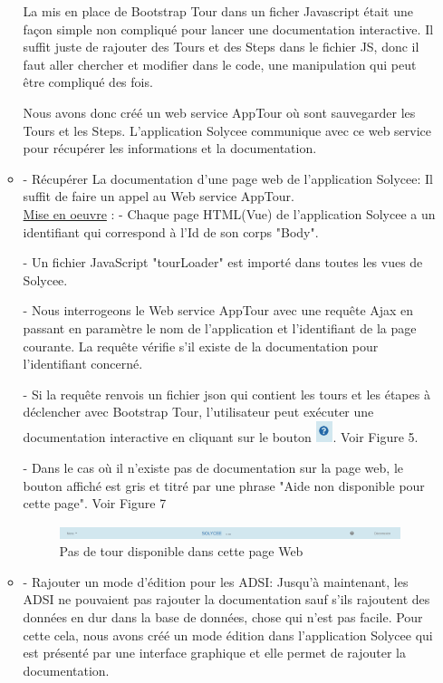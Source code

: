 \documentclass[12pt]{article}
\begin{document}
\begin{enumerate}
\begin{itemize}
La mis en place de Bootstrap Tour dans un ficher Javascript était une façon simple non compliqué pour lancer une documentation interactive. Il suffit juste de rajouter des Tours et des Steps dans le fichier JS, donc il faut aller chercher et modifier dans le code, une manipulation qui peut être compliqué des fois.

Nous avons donc créé un web service AppTour où sont sauvegarder les Tours et les Steps. L'application Solycee communique avec ce web service pour récupérer les informations et la documentation. \\ 

\item - Récupérer La documentation d'une page web de l'application Solycee: Il suffit de faire un appel au Web service AppTour. \\   
 
\underline{Mise en oeuvre} :
- Chaque page HTML(Vue) de l'application Solycee a un identifiant qui correspond à l'Id de son corps "Body".

- Un fichier JavaScript "tourLoader" est importé dans toutes les vues de Solycee.

- Nous interrogeons le Web service AppTour avec une requête Ajax en passant en paramètre le nom de l'application et l'identifiant de la page courante. La requête vérifie s'il existe de la documentation pour l’identifiant concerné. 

- Si la requête renvois un fichier json qui contient les tours et les étapes à déclencher avec Bootstrap Tour, l'utilisateur peut exécuter une documentation interactive en cliquant sur le bouton \includegraphics[width=5mm,scale=0.5]{diagrammes/Bouton_aideDispo.png}. Voir Figure 5.    

- Dans le cas où il n'existe pas de documentation sur la page web, le bouton affiché est gris et titré par une phrase "Aide non disponible pour cette page". Voir Figure 7 \\
\begin{figure}[H]
	\centering
 		\includegraphics[width=1\textwidth]{diagrammes/aideNonDispo.png} 
  		\caption{Pas de tour disponible dans cette page Web }
	\end{figure}
    
\item - Rajouter un mode d'édition pour les ADSI: Jusqu'à maintenant, les ADSI ne pouvaient pas rajouter la documentation sauf s'ils rajoutent des données en dur dans la base de données, chose qui n'est pas facile. Pour cette cela, nous avons créé un mode édition dans l'application Solycee qui est présenté par une interface graphique et elle  permet de rajouter la documentation.\\



\end{itemize}
\end{enumerate}
\end{document}
